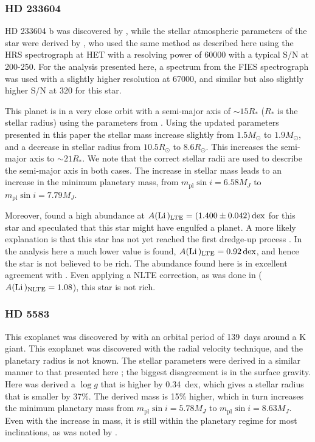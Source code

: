 \subsubsection{HD 233604}
\label{sub:HD_233604}

HD 233604 b was discovered by \citet{Nowak2013}, while the stellar atmospheric parameters of the
star were derived by \citet{Zielinski2012}, who used the same method as described here using the HRS
spectrograph at HET with a resolving power of \num{60000} with a typical S/N at 200-250. For the
analysis presented here, a spectrum from the FIES spectrograph was used with a slightly higher
resolution at \num{67000}, and similar but also slightly higher S/N at 320 for this star.

This planet is in a very close orbit with a semi-major axis of $\sim 15R_\ast$ ($R_\ast$ is the
stellar radius) using the parameters from \citet{Nowak2013}. Using the updated parameters presented
in this paper the stellar mass increase slightly from $1.5M_\odot$ to $1.9M_\odot$, and a decrease
in stellar radius from $10.5R_\odot$ to $8.6R_\odot$. This increases the semi-major axis to $\sim
21R_\ast$. We note that the correct stellar radii are used to describe the semi-major axis in both
cases. The increase in stellar mass leads to an increase in the minimum planetary mass, from
$m_\mathrm{pl}\sin i=6.58M_J$ to $m_\mathrm{pl}\sin i=7.79M_J$.

Moreover, \citet{Nowak2013} found a high  abundance at
$A(\ion{Li}{})_\mathrm{LTE}=\SI{1.400\pm0.042}{dex}$ for this star and speculated that this star
might have engulfed a planet. A more likely explanation is that this star has not yet reached the
first dredge-up process \citep{Nowak2013}. In the analysis here a much lower value is found,
$A(\ion{Li}{})_\mathrm{LTE}=\SI{0.92}{dex}$, and hence the star is not believed to be 
rich. The  abundance found here is in excellent agreement with \citet{Adamow2014}. Even
applying a NLTE correction, as was done in \citet{Adamow2014} ($A(\ion{Li}{})_\mathrm{NLTE}=1.08$),
this star is not  rich.


\subsubsection{HD 5583}
\label{sub:HD_5583}

This exoplanet was discovered by \citet{Niedzielski2016} with an orbital period of \SI{139}{days}
around a K giant. This exoplanet was discovered with the radial velocity technique, and the
planetary radius is not known. The stellar parameters were derived in a similar manner to that
presented here \citep[see][and references therein]{Niedzielski2016}; the biggest disagreement is in
the surface gravity. Here was derived a $\log g$ that is higher by \SI{0.34}{dex}, which gives a
stellar radius that is smaller by 37\%. The derived mass is 15\% higher, which in turn increases the
minimum planetary mass from $m_\mathrm{pl}\sin i=5.78M_J$ to $m_\mathrm{pl}\sin i=8.63M_J$. Even
with the increase in mass, it is still within the planetary regime for most inclinations, as was
noted by \citet{Niedzielski2016}.



